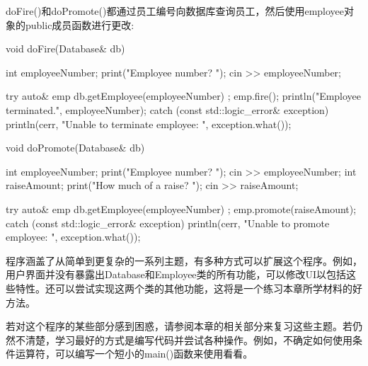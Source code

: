 doFire()和doPromote()都通过员工编号向数据库查询员工，然后使用employee对象的public成员函数进行更改:

\begin{cpp}
void doFire(Database& db)
{
    int employeeNumber;
    print("Employee number? ");
    cin >> employeeNumber;

    try {
        auto& emp { db.getEmployee(employeeNumber) };
        emp.fire();
        println("Employee {} terminated.", employeeNumber);
    } catch (const std::logic_error& exception) {
        println(cerr, "Unable to terminate employee: {}", exception.what());
    }
}

void doPromote(Database& db)
{
    int employeeNumber;
    print("Employee number? ");
    cin >> employeeNumber;
    int raiseAmount;
    print("How much of a raise? ");
    cin >> raiseAmount;

    try {
        auto& emp { db.getEmployee(employeeNumber) };
        emp.promote(raiseAmount);
    } catch (const std::logic_error& exception) {
        println(cerr, "Unable to promote employee: {}", exception.what());
    }
}
\end{cpp}


程序涵盖了从简单到更复杂的一系列主题，有多种方式可以扩展这个程序。例如，用户界面并没有暴露出Database和Employee类的所有功能，可以修改UI以包括这些特性。还可以尝试实现这两个类的其他功能，这将是一个练习本章所学材料的好方法。

若对这个程序的某些部分感到困惑，请参阅本章的相关部分来复习这些主题。若仍然不清楚，学习最好的方式是编写代码并尝试各种操作。例如，不确定如何使用条件运算符，可以编写一个短小的main()函数来使用看看。




